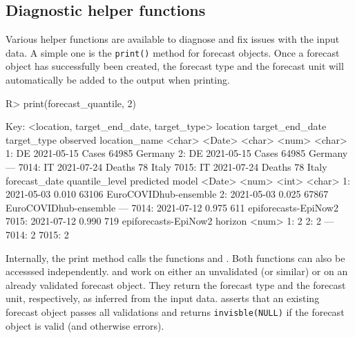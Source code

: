 \documentclass[
]{jss}
\begin{document}
\subsection{Diagnostic helper
functions}\label{diagnostic-helper-functions}

Various helper functions are available to diagnose and fix issues with
the input data. A simple one is the \texttt{print()} method for forecast
objects. Once a forecast object has successfully been created, the
forecast type and the forecast unit will automatically be added to the
output when printing.

\begin{CodeChunk}
\begin{CodeInput}
R> print(forecast_quantile, 2)
\end{CodeInput}
\begin{CodeOutput}

Key: <location, target_end_date, target_type>
      location target_end_date target_type observed location_name
        <char>          <Date>      <char>    <num>        <char>
   1:       DE      2021-05-15       Cases    64985       Germany
   2:       DE      2021-05-15       Cases    64985       Germany
  ---                                                            
7014:       IT      2021-07-24      Deaths       78         Italy
7015:       IT      2021-07-24      Deaths       78         Italy
      forecast_date quantile_level predicted                 model
             <Date>          <num>     <int>                <char>
   1:    2021-05-03          0.010     63106 EuroCOVIDhub-ensemble
   2:    2021-05-03          0.025     67867 EuroCOVIDhub-ensemble
  ---                                                             
7014:    2021-07-12          0.975       611  epiforecasts-EpiNow2
7015:    2021-07-12          0.990       719  epiforecasts-EpiNow2
      horizon
        <num>
   1:       2
   2:       2
  ---        
7014:       2
7015:       2
\end{CodeOutput}
\end{CodeChunk}

Internally, the print method calls the functions
 and . Both
functions can also be accesssed independently.
 and  work on
either an unvalidated  (or similar) or on an already
validated forecast object. They return the forecast type and the
forecast unit, respectively, as inferred from the input data.
 asserts that an existing forecast object
passes all validations and returns \texttt{invisble(NULL)} if the
forecast object is valid (and otherwise errors).
\end{document}

